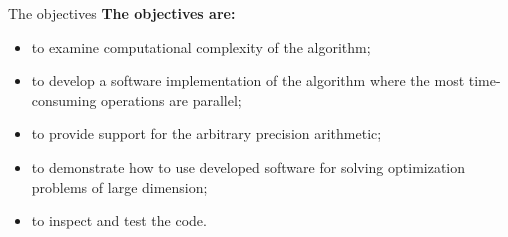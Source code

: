 \begin{frame}{The objectives}
\textbf{The objectives are:}
\begin{itemize}
\item to examine computational complexity of the algorithm;
\item 
to develop a software implementation of the algorithm where the most time-consuming operations are parallel;
\item to provide support for the arbitrary precision arithmetic;
\item to demonstrate how to use developed software for solving optimization problems of large dimension;
\item 
to inspect and test the code.
\end{itemize}
\end{frame}
